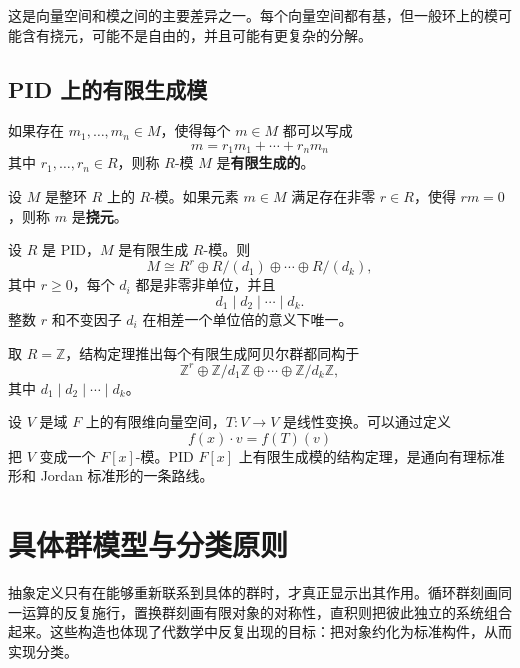 \begin{remark}
这是向量空间和模之间的主要差异之一。每个向量空间都有基，但一般环上的模可能含有挠元，可能不是自由的，并且可能有更复杂的分解。
\end{remark}

\subsection{PID 上的有限生成模}

\begin{definition}[有限生成模]
如果存在 $m_1,\dots,m_n\in M$，使得每个 $m\in M$ 都可以写成
\[
    m=r_1m_1+\cdots+r_nm_n
\]
其中 $r_1,\dots,r_n\in R$，则称 $R$-模 $M$ 是\textbf{有限生成的}。
\end{definition}

\begin{definition}[挠元]
设 $M$ 是整环 $R$ 上的 $R$-模。如果元素 $m\in M$ 满足存在非零 $r\in R$，使得 $rm=0$，则称 $m$ 是\textbf{挠元}。
\end{definition}

\begin{theorem}
设 $R$ 是 PID，$M$ 是有限生成 $R$-模。则
\[
    M\cong R^r\oplus R/(d_1)\oplus\cdots\oplus R/(d_k),
\]
其中 $r\geq 0$，每个 $d_i$ 都是非零非单位，并且
\[
    d_1\mid d_2\mid\cdots\mid d_k.
\]
整数 $r$ 和不变因子 $d_i$ 在相差一个单位倍的意义下唯一。
\end{theorem}

\begin{example}[有限阿贝尔群]
取 $R=\mathbb{Z}$，结构定理推出每个有限生成阿贝尔群都同构于
\[
    \mathbb{Z}^r\oplus \mathbb{Z}/d_1\mathbb{Z}\oplus\cdots\oplus\mathbb{Z}/d_k\mathbb{Z},
\]
其中 $d_1\mid d_2\mid\cdots\mid d_k$。
\end{example}

\begin{example}[重新解释线性代数]
设 $V$ 是域 $F$ 上的有限维向量空间，$T:V\to V$ 是线性变换。可以通过定义
\[
    f(x)\cdot v=f(T)(v)
\]
把 $V$ 变成一个 $F[x]$-模。PID $F[x]$ 上有限生成模的结构定理，是通向有理标准形和 Jordan 标准形的一条路线。
\end{example}

\section{具体群模型与分类原则}

抽象定义只有在能够重新联系到具体的群时，才真正显示出其作用。循环群刻画同一运算的反复施行，置换群刻画有限对象的对称性，直积则把彼此独立的系统组合起来。这些构造也体现了代数学中反复出现的目标：把对象约化为标准构件，从而实现分类。

